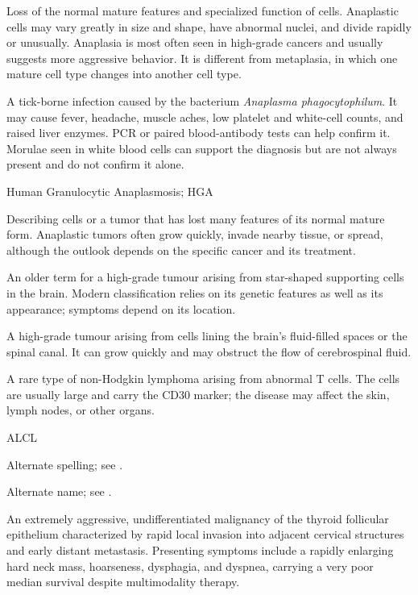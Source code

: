  Loss of the normal mature features and specialized function of cells. Anaplastic cells may vary greatly in size and shape, have abnormal nuclei, and divide rapidly or unusually. Anaplasia is most often seen in high-grade cancers and usually suggests more aggressive behavior. It is different from metaplasia, in which one mature cell type changes into another cell type.

 A tick-borne infection caused by the bacterium \textit{Anaplasma phagocytophilum}. It may cause fever, headache, muscle aches, low platelet and white-cell counts, and raised liver enzymes. PCR or paired blood-antibody tests can help confirm it. Morulae seen in white blood cells can support the diagnosis but are not always present and do not confirm it alone.

\synonyms
Human Granulocytic Anaplasmosis; HGA

 Describing cells or a tumor that has lost many features of its normal mature form. Anaplastic tumors often grow quickly, invade nearby tissue, or spread, although the outlook depends on the specific cancer and its treatment.

 An older term for a high-grade tumour arising from star-shaped supporting cells in the brain. Modern classification relies on its genetic features as well as its appearance; symptoms depend on its location.

 A high-grade tumour arising from cells lining the brain’s fluid-filled spaces or the spinal canal. It can grow quickly and may obstruct the flow of cerebrospinal fluid.

 A rare type of non-Hodgkin lymphoma arising from abnormal T cells. The cells are usually large and carry the CD30 marker; the disease may affect the skin, lymph nodes, or other organs.

\synonyms
ALCL

 Alternate spelling; see .

 Alternate name; see .

 An extremely aggressive, undifferentiated malignancy of the thyroid follicular epithelium characterized by rapid local invasion into adjacent cervical structures and early distant metastasis. Presenting symptoms include a rapidly enlarging hard neck mass, hoarseness, dysphagia, and dyspnea, carrying a very poor median survival despite multimodality therapy.

